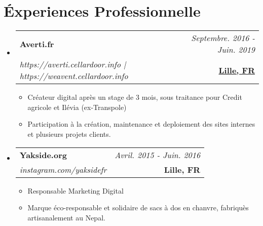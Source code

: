 \documentclass[a4paper,11pt]{article}
\makeatletter
\newcommand{\resumeProject}[4]{
\vspace{0.5mm}\item
    \begin{tabular*}{0.98\textwidth}[t]{l@{\extracolsep{\fill}}r}
        \textbf{#1} & \textit{\footnotesize{#3}} \\
        \footnotesize{\textit{#2}} & \footnotesize{#4}
    \end{tabular*}
    \vspace{-2.4mm}
}
\newcommand{\resumeSubHeadingListStart}{\begin{itemize}[leftmargin=*,labelsep=0mm]}
\newcommand{\resumeItemListStart}{\begin{justify}\begin{itemize}[leftmargin=3ex, rightmargin=2ex, noitemsep,labelsep=1.2mm,itemsep=0mm]\small}
\newcommand{\resumeSubHeadingListEnd}{\end{itemize}\vspace{2mm}}
\newcommand{\resumeItemListEnd}{\end{itemize}\end{justify}\vspace{-2mm}}
\makeatother
\begin{document}
\section{\textbf{Éxperiences Professionnelle}}
\resumeSubHeadingListStart 
    \resumeProject
      {Averti.fr} 
      {https://averti.cellardoor.info | https://weavent.cellardoor.info}
      {Septembre. 2016 - Juin. 2019} 
      {\href{https://telerp.cellardoor.info}{\textbf{Lille, FR}}}
      \vspace{-2mm}
      \resumeItemListStart
          \item {Créateur digital après un stage de 3 mois, sous traitance pour Credit agricole et Ilévia (ex-Transpole)}
        \item {Participation à la création, maintenance et deploiement des sites internes et plusieurs projets clients.}
      \resumeItemListEnd
          \vspace{-3mm}
    \resumeProject
      {Yakside.org} 
    {instagram.com/yaksidefr}
      {Avril. 2015 - Juin. 2016} 
      {{\textbf{Lille, FR}}}
      \vspace{-2mm}
      \resumeItemListStart
        \item {Responsable Marketing Digital}
        \item {Marque éco-responsable et solidaire de sacs à dos en chanvre, fabriquès artisanalement au Nepal.}
      \resumeItemListEnd
     \vspace{-2mm}
\resumeSubHeadingListEnd
\vspace{-7mm}
\end{document}
